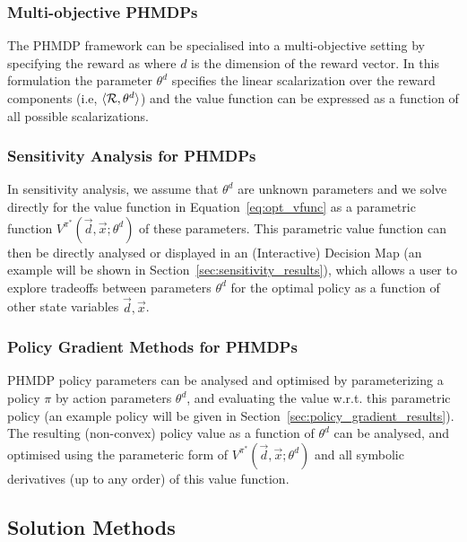 \subsubsection{Multi-objective PHMDPs}

The PHMDP framework can be specialised into a multi-objective setting
by specifying the reward as {\footnotesize \MORewardFunc} where
{\footnotesize $ d $} is the dimension of the reward vector. In this
formulation the parameter {\footnotesize $ \theta^{d} $} specifies the
linear scalarization over the reward components (i.e, $\langle
\mathcal{R}, \theta^{d} \rangle$) and the value function can be expressed
as a function of all possible scalarizations.

\subsubsection{Sensitivity Analysis for PHMDPs}

In sensitivity analysis, we assume that $\theta^{d}$ are unknown
parameters and we solve directly for the value function in
Equation~\eqref{eq:opt_vfunc} as a parametric function
$V^{\pi^{*}}(\vec{d}, \vec{x}; \theta^{d})$ of these parameters.  This
parametric value function can then be directly analysed or displayed in an
(Interactive) Decision Map (an example will be shown in
Section~\ref{sec:sensitivity_results}), which allows a user to explore
tradeoffs between parameters $\theta^{d}$ for the optimal policy as a
function of other state variables $\vec{d},\vec{x}$.

\subsubsection{Policy Gradient Methods for PHMDPs}

PHMDP policy parameters can be analysed and optimised by
parameterizing a policy $\pi$ by action parameters $\theta^{d}$,
and evaluating the value w.r.t. this parametric policy (an example policy will
be given in Section~\ref{sec:policy_gradient_results}).  The resulting
(non-convex) policy value as a function of $\theta^{d}$ can be
analysed, and optimised using the parameteric form of
$V^{\pi^{*}}(\vec{d}, \vec{x}; \theta^{d})$ and all symbolic
derivatives (up to any order) of this value function.

\subsection{Solution Methods}

